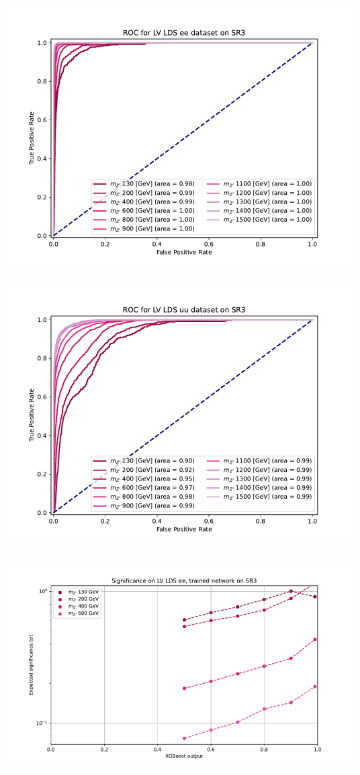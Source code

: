 \documentclass[12pt, a4paper]{book}
\begin{document}
\begin{figure}[!ht]
\begin{subfigure}[b]{0.49\textwidth}
      \includegraphics[width=1\textwidth]{XGBoost/Model_independent/150/LV_LDS/ROC_ee.pdf}
   \end{subfigure}
   \hfill
   \begin{subfigure}[b]{0.49\textwidth}
      \centering
      \includegraphics[width=1\textwidth]{XGBoost/Model_independent/150/LV_LDS/ROC_uu.pdf}
   \end{subfigure}
   \hfill
	\begin{subfigure}[b]{0.49\textwidth}
      \centering
      \includegraphics[width=1\textwidth]{XGBoost/Model_independent/150/LV_LDS/EXP_SIG_ee.pdf}

\end{subfigure}
\end{figure}
\end{document}
